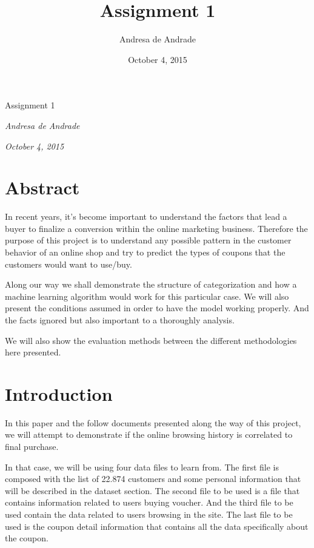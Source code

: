 \documentclass[]{article}
\title{Assignment 1}
\author{Andresa de Andrade}
\date{October 4, 2015}
\begin{document}
\begin{center}
\huge Assignment 1 \\[0.2cm]
\end{center}
\begin{center}
\large \emph{Andresa de Andrade}\\[0.1cm]
\end{center}
\begin{center}
\large \emph{October 4, 2015} \\
\end{center}
\normalsize


{
\hypersetup{linkcolor=black}
\setcounter{tocdepth}{2}
\tableofcontents
}
\section{Abstract}\label{abstract}

In recent years, it's become important to understand the factors that
lead a buyer to finalize a conversion within the online marketing
business. Therefore the purpose of this project is to understand any
possible pattern in the customer behavior of an online shop and try to
predict the types of coupons that the customers would want to use/buy.

Along our way we shall demonstrate the structure of categorization and
how a machine learning algorithm would work for this particular case. We
will also present the conditions assumed in order to have the model
working properly. And the facts ignored but also important to a
thoroughly analysis.

We will also show the evaluation methods between the different
methodologies here presented.

\section{Introduction}\label{introduction}

In this paper and the follow documents presented along the way of this
project, we will attempt to demonstrate if the online browsing history
is correlated to final purchase.

In that case, we will be using four data files to learn from. The first
file is composed with the list of 22.874 customers and some personal
information that will be described in the dataset section. The second
file to be used is a file that contains information related to users
buying voucher. And the third file to be used contain the data related
to users browsing in the site. The last file to be used is the coupon
detail information that contains all the data specifically about the
coupon.
\end{document}
